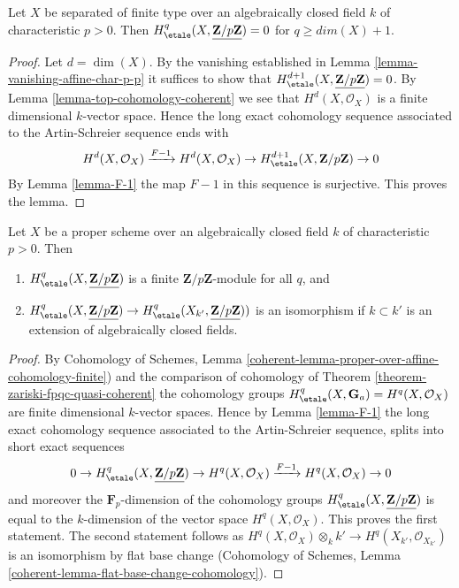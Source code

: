 \begin{lemma}
\label{lemma-vanishing-variety-char-p-p}
Let $X$ be separated of finite type over an algebraically closed
field $k$ of characteristic $p > 0$. Then
$H_\etale^q(X, \underline{\mathbf{Z}/p\mathbf{Z}}) = 0$ for
$q \geq dim(X) + 1$.
\end{lemma}

\begin{proof}
Let $d = \dim(X)$. By the vanishing established in
Lemma \ref{lemma-vanishing-affine-char-p-p}
it suffices to show that
$H_\etale^{d + 1}(X, \underline{\mathbf{Z}/p\mathbf{Z}}) = 0$.
By Lemma \ref{lemma-top-cohomology-coherent} we see that
$H^d(X, \mathcal{O}_X)$ is a finite dimensional $k$-vector space.
Hence the long exact cohomology sequence associated to the
Artin-Schreier sequence ends with
$$
H^d(X, \mathcal{O}_X) \xrightarrow{F - 1}
H^d(X, \mathcal{O}_X) \to H^{d + 1}_\etale(X, \mathbf{Z}/p\mathbf{Z}) \to 0
$$
By Lemma \ref{lemma-F-1} the map $F - 1$ in this sequence is surjective.
This proves the lemma.
\end{proof}

\begin{lemma}
\label{lemma-finiteness-proper-variety-char-p-p}
Let $X$ be a proper scheme over an algebraically closed
field $k$ of characteristic $p > 0$. Then
\begin{enumerate}
\item $H_\etale^q(X, \underline{\mathbf{Z}/p\mathbf{Z}})$
is a finite $\mathbf{Z}/p\mathbf{Z}$-module for all $q$, and
\item $H^q_\etale(X, \underline{\mathbf{Z}/p\mathbf{Z}}) \to
H^q_\etale(X_{k'}, \underline{\mathbf{Z}/p\mathbf{Z}}))$
is an isomorphism if $k \subset k'$ is an extension of algebraically
closed fields.
\end{enumerate}
\end{lemma}

\begin{proof}
By Cohomology of Schemes, Lemma
\ref{coherent-lemma-proper-over-affine-cohomology-finite})
and the comparison of cohomology of
Theorem \ref{theorem-zariski-fpqc-quasi-coherent} the cohomology groups
$H^q_\etale(X, \mathbf{G}_a) = H^q(X, \mathcal{O}_X)$ are
finite dimensional $k$-vector spaces. Hence by
Lemma \ref{lemma-F-1} the long exact cohomology sequence
associated to the Artin-Schreier sequence, splits into
short exact sequences
$$
0 \to H_\etale^q(X, \underline{\mathbf{Z}/p\mathbf{Z}}) \to
H^q(X, \mathcal{O}_X) \xrightarrow{F - 1} H^q(X, \mathcal{O}_X) \to 0
$$
and moreover the $\mathbf{F}_p$-dimension of the cohomology groups
$H_\etale^q(X, \underline{\mathbf{Z}/p\mathbf{Z}})$ is equal to the
$k$-dimension of the vector space $H^q(X, \mathcal{O}_X)$.
This proves the first statement. The second statement follows
as $H^q(X, \mathcal{O}_X) \otimes_k k' \to H^q(X_{k'}, \mathcal{O}_{X_{k'}})$
is an isomorphism by flat base change
(Cohomology of Schemes,
Lemma \ref{coherent-lemma-flat-base-change-cohomology}).
\end{proof}





